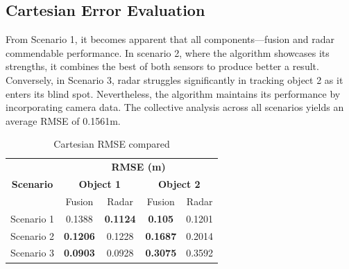 \subsection{Cartesian Error Evaluation}\label{sec:3-cart}
From Scenario 1, it becomes apparent that all components—fusion and radar commendable performance. 
In scenario 2, where the algorithm showcases its strengths, it combines the best of both sensors to produce better a result.
Conversely, in Scenario 3, radar struggles significantly in tracking object 2 as it enters its blind spot. 
Nevertheless, the algorithm maintains its performance by incorporating camera data. 
The collective analysis across all scenarios yields an average RMSE of 0.1561m.
\begin{table}[h!]
    \begin{center}
      \label{tab:table5}
      \begin{tabular}{c|c|c|c|c} %
        \multirow{3}{*}{\textbf{Scenario}} & \multicolumn{4}{c}{\textbf{RMSE (m)}}\\\cline{2-5}
                                            & \multicolumn{2}{c|}{\textbf{Object 1}}  & \multicolumn{2}{c}{\textbf{Object 2}}\\
        \cline{2-5}
                   & Fusion & Radar & Fusion & Radar \\
        \hline
        Scenario 1 & 0.1388  & \textbf{0.1124} & \textbf{0.105}   & 0.1201 \\
        Scenario 2 & \textbf{0.1206}  & 0.1228 & \textbf{0.1687}  & 0.2014 \\
        Scenario 3 & \textbf{0.0903}  & 0.0928 & \textbf{0.3075}  & 0.3592 \\
      \end{tabular}
    \end{center}
    \caption{Cartesian RMSE compared}
    \label{tab:cart_rmse}
  \end{table}

